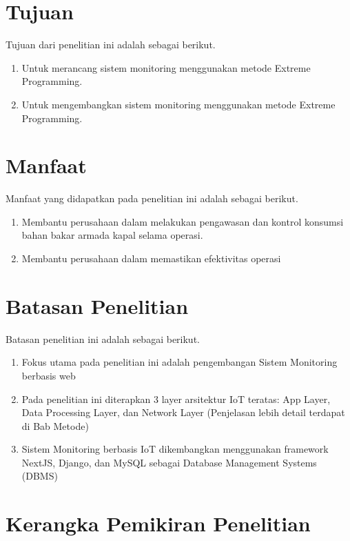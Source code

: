 \section{Tujuan}

Tujuan dari penelitian ini adalah sebagai berikut.

\begin{enumerate}
    \item Untuk merancang sistem monitoring menggunakan metode Extreme Programming.
    \item Untuk mengembangkan sistem monitoring menggunakan metode Extreme Programming.
\end{enumerate}

\section{Manfaat}

Manfaat yang didapatkan pada penelitian ini adalah sebagai berikut.

\begin{enumerate}
    \item Membantu perusahaan dalam melakukan pengawasan dan kontrol konsumsi bahan bakar armada kapal selama operasi.
    \item Membantu perusahaan dalam memastikan efektivitas operasi
\end{enumerate}


\section{Batasan Penelitian}

Batasan penelitian ini adalah sebagai berikut.

\begin{enumerate}
    \item Fokus utama pada penelitian ini adalah pengembangan Sistem Monitoring berbasis web
    \item Pada penelitian ini diterapkan 3 layer arsitektur IoT teratas: App Layer, Data Processing Layer, dan Network Layer (Penjelasan lebih detail terdapat di Bab Metode)
    \item Sistem Monitoring berbasis IoT dikembangkan menggunakan framework
    NextJS, Django, dan MySQL sebagai Database Management Systems (DBMS)
\end{enumerate}
\section{Kerangka Pemikiran Penelitian}

